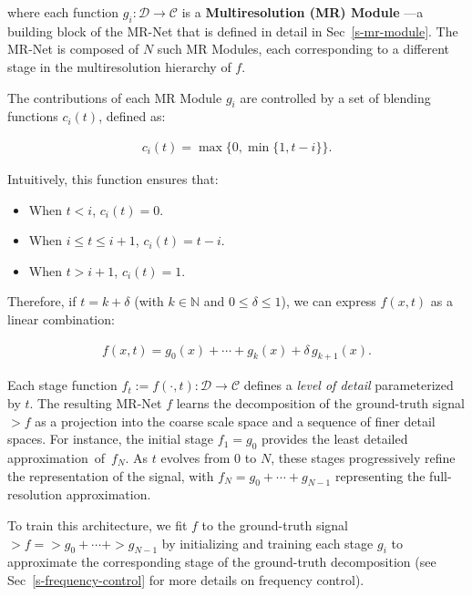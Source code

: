 where each function \( g_i : \mathcal{D} \to \mathcal{C} \) is a \textbf{Multiresolution (MR) Module} —a building block of the MR-Net that is defined in detail in Sec~\ref{s-mr-module}. The MR-Net is composed of \( N \) such MR Modules, each corresponding to a different stage in the multiresolution hierarchy of \( f \). 

The contributions of each MR Module \( g_i \) are controlled by a set of blending functions \( c_i(t) \), defined as:

\begin{align}\label{e-control}
c_i(t) = \max \Big\{ 0, \min \big\{ 1, t - i \big\} \Big\}.
\end{align}

Intuitively, this function ensures that:

\begin{itemize}
    \item When \( t < i \), \( c_i(t) = 0 \).
    \item When \( i \leq t \leq i+1 \), \( c_i(t) = t - i \).
    \item When \( t > i + 1 \), \( c_i(t) = 1 \).
\end{itemize}

Therefore, if \( t = k + \delta \) (with \( k \in \mathbb{N} \) and \( 0 \leq \delta \leq 1 \)), we can express \( f(x, t) \) as a linear combination:

\begin{align}
f(x, t) = g_0(x) + \cdots + g_k(x) + \delta \, g_{k+1}(x).
\end{align}

Each stage function \( f_t := f(\cdot, t) : \mathcal{D} \to \mathcal{C} \) defines a \textit{level of detail} parameterized by \( t \). The resulting MR-Net $f$ learns the decomposition of the ground-truth signal $\gt{f}$ as a projection into the coarse scale space and a sequence of finer detail spaces. For instance, the initial stage $f_1=g_0$ provides the least detailed approximation~of~$f_N$. As \( t \) evolves from 0 to \( N \), these stages progressively refine the representation of the signal, with \( f_N = g_0 + \cdots + g_{N-1} \) representing the full-resolution approximation.

To train this architecture, we fit \( f \) to the ground-truth signal \( \gt{f} = \gt{g}_0 + \cdots + \gt{g}_{N-1} \) by initializing and training each stage \( g_i \) to approximate the corresponding stage of the ground-truth decomposition (see Sec~\ref{s-frequency-control} for more details on frequency control).

